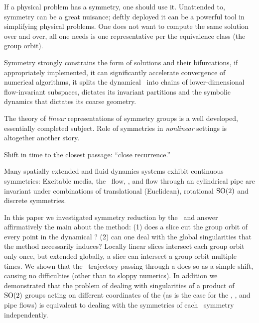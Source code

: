 

If a physical problem has a symmetry, one should use it.
Unattended to, symmetry can be a great nuisance; deftly deployed
it can be a powerful tool in simplifying physical problems.
One does not want to compute the same solution over and over, all
one needs is one representative per the equivalence class (the group orbit).

Symmetry strongly constrains the form of solutions and their bifurcations,
if appropriately implemented, it can significantly accelerate
convergence of numerical algorithms,
it splits the dynamical \statesp\ into chains of lower-dimensional flow-invariant
subspaces, dictates its invariant partitions and the symbolic dynamics that dictates its coarse geometry.

The theory of \emph{linear} representations of symmetry groups is
a well developed, essentially completed subject. Role of symmetries in
\emph{nonlinear} settings is altogether another story.

Shift in time to the closest passage: ``close recurrence.''

Many spatially extended and fluid dynamics systems exhibit continuous symmetries:
Excitable media,
the \KS\ flow,
{\pCf}, and flow through an
cylindrical pipe are invariant under
combinations of translational (Euclidean), rotational
$\textrm{SO}(2)$ and discrete symmetries.

In this paper we investigated symmetry reduction by the
\mslices\ and answer affirmatively the main about the method:
(1) does a slice cut the group orbit of every point in the dynamical \statesp?
(2) can one deal with the global singularities that the method necessarily
induces? Locally linear slices intersect each group orbit only once,
but extended globally, a slice can intersect a group orbit multiple times.
We shown that the \reducedsp\ trajectory
passing through a {\sset} does so as a simple shift,
causing no difficulties (other than to sloppy numerics). In addition we
demonstrated that the problem of dealing with singularities of a product
of $\textrm{SO}(2)$ groups acting on different coordinates of the {\statesp}
(as is the case for the \KS{},
{\pCf}, and
pipe flows) is equivalent to dealing with the
symmetries of each \ symmetry independently.



